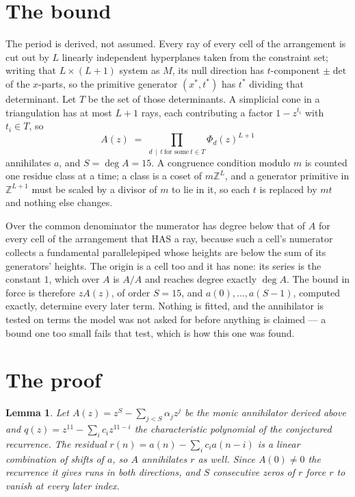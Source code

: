 \documentclass[11pt,a4paper]{article}
\theoremstyle{plain}
\newtheorem{lemma}[theorem]{Lemma}
\theoremstyle{definition}
\begin{document}
\section{The bound}

The period is derived, not assumed. Every ray of every cell of the arrangement is cut out by
$L$ linearly independent hyperplanes taken from the constraint set; writing that $L\times(L+1)$
system as $M$, its null direction has $t$-component $\pm\det$ of the $x$-parts, so the
primitive generator $(x^*,t^*)$ has $t^*$ dividing that determinant. Let $T$ be the set of
those determinants. A simplicial cone in a triangulation has at most $L+1$ rays, each
contributing a factor $1-z^{t_i}$ with $t_i\in T$, so
\[
A(z)\;=\;\prod_{d\,\mid\,t\ \text{for some}\ t\in T}\Phi_d(z)^{L+1}
\]
annihilates $a$, and $S=\deg A=15$. A congruence condition modulo $m$ is counted one residue
class at a time; a class is a coset of $m\mathbb{Z}^L$, and a generator primitive in
$\mathbb{Z}^{L+1}$ must be scaled by a divisor of $m$ to lie in it, so each $t$ is replaced
by $mt$ and nothing else changes.

Over the common denominator the numerator has degree below that of $A$ for every cell of the
arrangement that HAS a ray, because such a cell's numerator collects a fundamental
parallelepiped whose heights are below the sum of its generators' heights. The origin is a cell
too and it has none: its series is the constant $1$, which over $A$ is $A/A$ and reaches degree
exactly $\deg A$. The bound in force is therefore $zA(z)$, of order $S=15$, and
$a(0),\dots,a(S-1)$, computed exactly, determine every later term. Nothing is fitted, and the
annihilator is tested on terms the model was not asked for before anything is claimed --- a
bound one too small fails that test, which is how this one was found.

\section{The proof}

\begin{lemma}\label{lem:crit}
Let $A(z)=z^S-\sum_{j<S}\alpha_jz^{j}$ be the monic annihilator derived above and
$q(z)=z^{11}-\sum_ic_iz^{11-i}$ the characteristic polynomial of the conjectured
recurrence. The residual $r(n)=a(n)-\sum_ic_ia(n-i)$ is a linear combination of shifts of $a$,
so $A$ annihilates $r$ as well. Since $A(0)\ne0$ the recurrence it gives runs in both
directions, and $S$ consecutive zeros of $r$ force $r$ to vanish at every later index.
\end{lemma}
\end{document}
